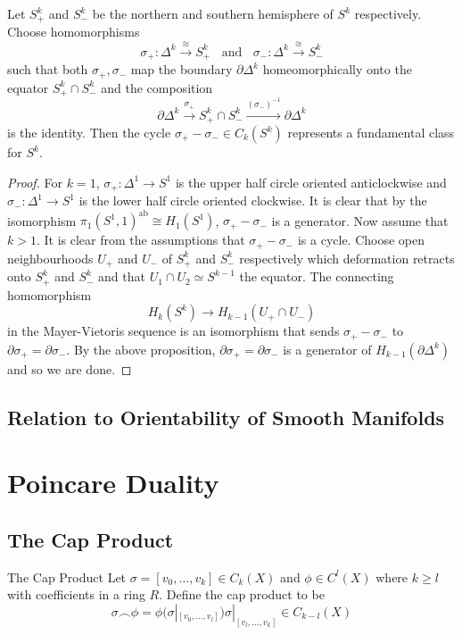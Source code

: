 \documentclass[a4paper]{article}
\begin{document}
\begin{crl}{}{} Let $S_+^k$ and $S_-^k$ be the northern and southern hemisphere of $S^k$ respectively. Choose homomorphisms $$\sigma_+:\Delta^k\overset{\cong}{\longrightarrow} S_+^k\;\;\text{ and }\;\;\sigma_-:\Delta^k\overset{\cong}{\longrightarrow} S_-^k$$ such that both $\sigma_+,\sigma_-$ map the boundary $\partial\Delta^k$ homeomorphically onto the equator $S_+^k\cap S_-^k$ and the composition $$\partial\Delta^k\overset{\sigma_+}{\longrightarrow}S_+^k\cap S_-^k\overset{(\sigma_-)^{-1}}{\longrightarrow}\partial\Delta^k$$ is the identity. Then the cycle $\sigma_+-\sigma_-\in C_k(S^k)$ represents a fundamental class for $S^k$. \tcbline
\begin{proof}
For $k=1$, $\sigma_+:\Delta^1\to S^1$ is the upper half circle oriented anticlockwise and $\sigma_-:\Delta^1\to S^1$ is the lower half circle oriented clockwise. It is clear that by the isomorphism $\pi_1(S^1,1)^\text{ab}\cong H_1(S^1)$, $\sigma_+-\sigma_-$ is a generator. Now assume that $k>1$. It is clear from the assumptions that $\sigma_+-\sigma_-$ is a cycle. Choose open neighbourhoods $U_+$ and $U_-$ of $S_+^k$ and $S_-^k$ respectively which deformation retracts onto $S_+^k$ and $S_-^k$ and that $U_1\cap U_2\simeq S^{k-1}$ the equator. The connecting homomorphism $$H_k(S^k)\to H_{k-1}(U_+\cap U_-)$$ in the Mayer-Vietoris sequence is an isomorphism that sends $\sigma_+-\sigma_-$ to $\partial\sigma_+=\partial\sigma_-$. By the above proposition, $\partial\sigma_+=\partial\sigma_-$ is a generator of $H_{k-1}(\partial\Delta^k)$ and so we are done. 
\end{proof}
\end{crl}


\subsection{Relation to Orientability of Smooth Manifolds}

\pagebreak
\section{Poincare Duality}
\subsection{The Cap Product}
\begin{defn}{The Cap Product}{} Let $\sigma=[v_0,\dots,v_k]\in C_k(X)$ and $\phi\in C^l(X)$ where $k\geq l$ with coefficients in a ring $R$. Define the cap product to be $$\sigma\frown\phi=\phi(\sigma|_{[v_0,\dots,v_l]})\sigma|_{[v_l,\dots,v_k]}\in C_{k-l}(X)$$
\end{defn}
\end{document}
